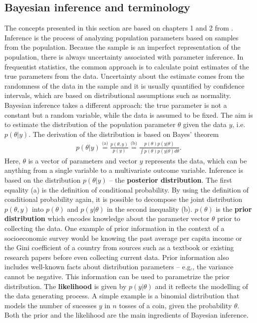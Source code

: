 \subsection{Bayesian inference and terminology}

The concepts presented in this section are based on chapters 1 and 2 from \cite{gelman_bayesian_2014}.
Inference is the process of analyzing population parameters based on samples from the population.
Because the sample is an imperfect representation of the population, there is always uncertainty associated with parameter inference.
In frequentist statistics, the common approach is to calculate point estimates of the true parameters from the data.
Uncertainty about the estimate comes from the randomness of the data in the sample and it is usually quantified by confidence intervals, which are based on distributional assumptions such as normality.
Bayesian inference takes a different approach: the true parameter is not a constant but a random variable, while the data is assumed to be fixed.
The aim is to estimate the distribution of the population parameter $\theta$ given the data $y$, i.e. $p(\theta|y)$.
The derivation of the distribution is based on Bayes' theorem
\begin{gather*}
	\displaystyle p(\theta | y) \overset {\text{(a)}}{=}  \frac {p(\theta, y)}{p(y)} \overset {\text{(b)}}{=} \frac {p(\theta) p(y|\theta)}{\int p(\theta) p(y|\theta)d\theta}.
\end{gather*}
Here, $\theta$ is a vector of parameters and vector $y$ represents the data, which can be anything from a single variable to a multivariate outcome variable.
Inference is based on the distribution $p(\theta | y )$ – the \textbf{posterior distribution}.
The first equality (a) is the definition of conditional probability.
By using the definition of conditional probability again, it is possible to decompose the joint distribution $p(\theta, y)$ into $p(\theta)$ and $p(y|\theta)$ in the second inequality (b).
$p(\theta)$ is the \textbf{prior distribution} which encodes knowledge about the parameter vector $\theta$ prior to collecting the data.
One example of prior information in the context of a socioeconomic survey would be knowing the past average per capita income or the Gini coefficient of a country from sources such as a textbook or existing research papers before even collecting current data.
Prior information also includes well-known facts about distribution parameters – e.g., the variance cannot be negative.
This information can be used to parametrize the prior distribution.
The \textbf{likelihood} is given by $p(y | \theta)$ and it reflects the modelling of the data generating process.
A simple example is a binomial distribution that models the number of sucesses $y$ in $n$ tosses of a coin, given the probability $\theta$.
Both the prior and the likelihood are the main ingredients of Bayesian inference.

